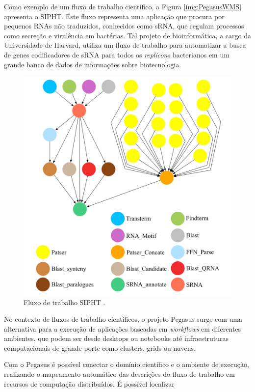 \documentclass[tese,capa]{texufpel}
\begin{document}
Como exemplo de um fluxo de trabalho científico, a Figura \ref{img:PegasusWMS} apresenta o SIPHT. Este fluxo representa uma aplicação que procura por pequenos RNAs não traduzidos, conhecidos como sRNA, que regulam processos como secreção e virulência em bactérias. Tal projeto de bioinformática, a cargo da Universidade de Harvard, utiliza um fluxo de trabalho para automatizar a busca de genes codificadores de sRNA para todos os \emph{replicons} bacterianos em um grande banco de dados de informações sobre biotecnologia.

\begin{figure}[H]
	\centerline{
		\includegraphics[scale=0.2]{images/sipht.png}}
	\caption[Fluxo de trabalho SIPHT]{Fluxo de trabalho SIPHT \cite{juveCharacterizingProfilingScientific2013}.}
	\label{sipht}
\end{figure}

No contexto de fluxos de trabalho científicos, o projeto Pegasus \cite{Pegasus2022} surge com uma alternativa para a execução de aplicações baseadas em \emph{workflows} em diferentes ambientes, que podem ser desde desktops ou notebooks até infraestruturas computacionais de grande porte como clusters, grids ou nuvens.

Com o Pegasus é possível conectar o domínio científico e o ambiente de execução,  realizando o mapeamento automático das descrições do fluxo de trabalho em recursos de computação distribuídos. É possível localizar 
\end{document}
